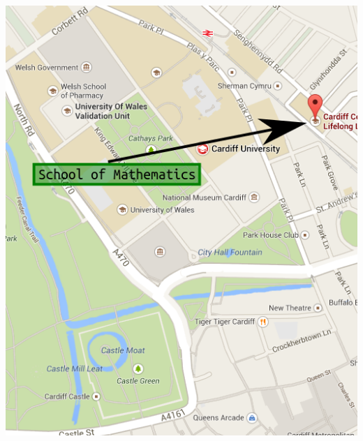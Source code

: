 \documentclass {leaflet}
\begin{document}
\begin{center}
\includegraphics[width=.8\textwidth]{./Images/map.png}
\end{center}


\loggingall
\end{document}
